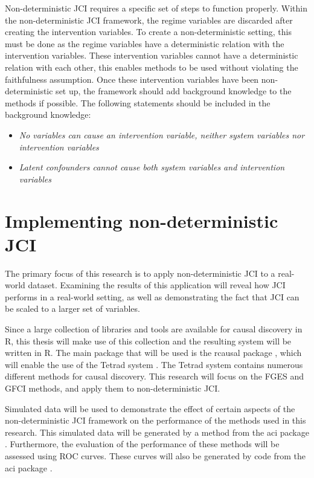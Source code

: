 \documentclass[a4paper,pdf]{article}
\begin{document}

Non-deterministic JCI requires a specific set of steps to function properly. Within the non-deterministic JCI framework, the regime variables are discarded after creating the intervention variables. To create a non-deterministic setting, this must be done as the regime variables have a deterministic relation with the intervention variables.
These intervention variables cannot have a deterministic relation with each other, this enables methods to be used without violating the faithfulness assumption. Once these intervention variables have been non-deterministic set up, the framework should add background knowledge to the methods if possible. The following statements should be included in the background knowledge:
\begin{itemize}
    \item \textit{No variables can cause an intervention variable, neither system variables nor intervention variables}
    \item \textit{Latent confounders cannot cause both system variables and intervention variables}
\end{itemize}

\section{Implementing non-deterministic JCI}
The primary focus of this research is to apply non-deterministic JCI to a real-world dataset. Examining the results of this application will reveal how JCI performs in a real-world setting, as well as demonstrating the fact that JCI can be scaled to a larger set of variables.

Since a large collection of libraries and tools are available for causal discovery in R, this thesis will make use of this collection and the resulting system will be written in R. The main package that will be used is the rcausal package \cite{r-wrapper}, which will enable the use of the Tetrad system \cite{tetrad}. The Tetrad system contains numerous different methods for causal discovery. This research will focus on the FGES and GFCI methods, and apply them to non-deterministic JCI. 

Simulated data will be used to demonstrate the effect of certain aspects of the non-deterministic JCI framework on the performance of the methods used in this research. This simulated data will be generated by a method from the aci package \cite{jci}. Furthermore, the evaluation of the performance of these methods will be assessed using ROC curves. These curves will also be generated by code from the aci package \cite{jci}. 
\end{document}
